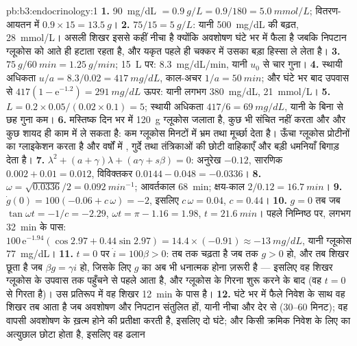 \begin{solution}{pb:b3:endocrinology:1}
\textbf{1.} \qty{90}{mg/dL} $= \qty{0.9}{g/L} = 0.9/180 = \qty{5.0}{mmol/L}$;
वितरण-आयतन में $0.9\times 15 = \qty{13.5}{g}$।
\textbf{2.} $75/15 = \qty{5}{g/L}$: यानी \qty{500}{mg/dL} की बढ़त,
\qty{28}{mmol/L}। असली शिखर इससे कहीं नीचा है क्योंकि अवशोषण घंटे भर
में फैला है जबकि निपटान ग्लूकोस को आते ही हटाता रहता है, और यकृत पहले
ही चक्कर में उसका बड़ा हिस्सा ले लेता है।
\textbf{3.} $\qty{75}{g}/\qty{60}{min} = \qty{1.25}{g/min}$;
\qty{15}{L} पर: \qty{8.3}{mg/dL/min}, यानी $u_{0}$ से चार गुना।
\textbf{4.} स्थायी अधिकता $u/a = 8.3/0.02 = \qty{417}{mg/dL}$, काल-अचर
$1/a = \qty{50}{min}$; और घंटे भर बाद उपवास से $417(1 -
\mathrm{e}^{-1.2}) = \qty{291}{mg/dL}$ ऊपर: यानी लगभग
\qty{380}{mg/dL}, \qty{21}{mmol/L}।
\textbf{5.} $L = 0.2\times 0.05/(0.02\times 0.1) = 5$; स्थायी अधिकता
$417/6 = \qty{69}{mg/dL}$, यानी  के बिना से छह गुना कम।
\textbf{6.} मस्तिष्क दिन भर में \qty{120}{g} ग्लूकोस जलाता है, कुछ भी
संचित नहीं करता और और कुछ शायद ही काम में ले सकता है: कम ग्लूकोस
मिनटों में भ्रम तथा मूर्च्छा देता है। ऊँचा ग्लूकोस प्रोटीनों का
ग्लाइकेशन करता है और वर्षों में , गुर्दे तथा तंत्रिकाओं की
छोटी वाहिकाएँ और बड़ी धमनियाँ बिगाड़ देता है।
\textbf{7.} $\lambda^{2} + (a + \gamma)\lambda + (a\gamma + s\beta) = 0$:
अनुरेख $-0.12$, सारणिक $0.002 + 0.01 = 0.012$, विविक्तकर
$0.0144 - 0.048 = -0.0336$।
\textbf{8.} $\omega = \sqrt{0.0336}/2 = \qty{0.092}{min^{-1}}$; आवर्तकाल
\qty{68}{min}; क्षय-काल $2/0.12 = \qty{16.7}{min}$।
\textbf{9.} $\dot g(0) = 100(-0.06 + c\,\omega) = -2$, इसलिए $c\,\omega =
0.04$, $c = 0.44$।
\textbf{10.} $g = 0$ तब जब $\tan\omega t = -1/c = -2.29$, $\omega t =
\pi - 1.16 = 1.98$, $t = \qty{21.6}{min}$। पहले निम्निष्ठ पर, लगभग
\qty{32}{min} के पास: $100\,\mathrm{e}^{-1.94}(\cos 2.97 + 0.44\sin 2.97) =
14.4\times(-0.91) \approx -\qty{13}{mg/dL}$, यानी ग्लूकोस
\qty{77}{mg/dL}।
\textbf{11.} $t = 0$ पर $\dot i = 100\beta > 0$:  तब तक चढ़ता है
जब तक $g > 0$ हो, और तब शिखर छूता है जब $\beta g = \gamma i$ हो, जिसके
लिए $g$ का अब भी धनात्मक होना ज़रूरी है --- इसलिए वह शिखर ग्लूकोस के
उपवास तक पहुँचने से पहले आता है, और ग्लूकोस के गिरना शुरू करने के बाद
(वह $t = 0$ से गिरता है)। उस प्रतिरूप में वह शिखर \qty{12}{min} के पास
है।
\textbf{12.} घंटे भर में फैले निवेश के साथ वह शिखर तब आता है जब अवशोषण
और निपटान संतुलित हों, यानी नीचा और देर से (30--60 मिनट); वह वापसी
अवशोषण के ख़त्म होने की प्रतीक्षा करती है, इसलिए दो घंटे; और किसी
क्रमिक निवेश के लिए  का अत्युछाल छोटा होता है, इसलिए वह ढलान

\end{solution}
